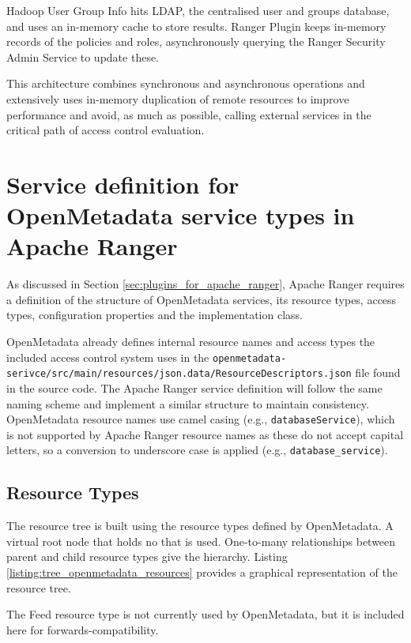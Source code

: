 Hadoop User Group Info hits LDAP, the centralised user and groups database, and uses an in-memory cache to store results. Ranger Plugin keeps in-memory records of the policies and roles, asynchronously querying the Ranger Security Admin Service to update these.

This architecture combines synchronous and asynchronous operations and extensively uses in-memory duplication of remote resources to improve performance and avoid, as much as possible, calling external services in the critical path of access control evaluation.

\section[Service definition for OpenMetadata]{\label{sec:service_def} Service definition for OpenMetadata service types in Apache Ranger}

As discussed in Section \ref{sec:plugins_for_apache_ranger}, Apache Ranger requires a definition of the structure of OpenMetadata services, its resource types, access types, configuration properties and the implementation class. 

OpenMetadata already defines internal resource names and access types the included access control system uses in the \texttt{openmetadata-serivce/src/main/resources/json.data/ResourceDescriptors.json} file found in the source code. The Apache Ranger service definition will follow the same naming scheme and implement a similar structure to maintain consistency. OpenMetadata resource names use camel casing (e.g., \texttt{databaseService}), which is not supported by Apache Ranger resource names as these do not accept capital letters, so a conversion to underscore case is applied (e.g., \texttt{database_service}).

\subsection{Resource Types}

The resource tree is built using the resource types defined by OpenMetadata. A virtual root node that holds no that is used. One-to-many relationships between parent and child resource types give the hierarchy. Listing \ref{listing:tree_openmetadata_resources} provides a graphical representation of the resource tree.

The Feed resource type is not currently used by OpenMetadata, but it is included here for forwards-compatibility.

